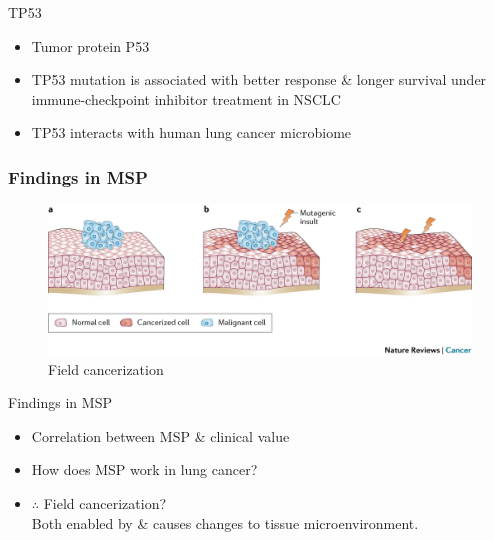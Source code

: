 \documentclass{beamer}
\begin{document}
\begin{frame}[allowframebreaks]
                \begin{block}{TP53}
                    \begin{itemize}
                        \item Tumor protein P53
                        \item TP53 mutation is associated with better response \& longer survival under immune-checkpoint inhibitor treatment in NSCLC \cite{TP53-01}
                        \item TP53 interacts with human lung cancer microbiome \cite{TP53-02}
                    \end{itemize}
                \end{block}
            \end{frame}

            \begin{frame}
                \frametitle{Findings in MSP}

                \begin{figure}
                    \includegraphics[width=0.6 \linewidth]{figures/LungCancer/cancerization.jpg}
                    \caption{Field cancerization \cite{cancerization-01}}
                \end{figure}

                \begin{block}{Findings in MSP}
                    \begin{itemize}
                        \item Correlation between MSP \& clinical value
                        \item How does MSP work in lung cancer?
                        \item $\therefore$ Field cancerization? \\
                            Both enabled by \& causes changes to tissue microenvironment.
                    \end{itemize}
                \end{block}
            \end{frame}
\end{document}

